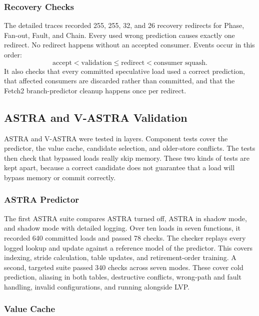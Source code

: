 \subsubsection{Recovery Checks}

The detailed traces recorded 255, 255, 32, and 26 recovery redirects
for Phase, Fan-out, Fault, and Chain. Every used wrong prediction causes exactly one redirect. No
redirect happens without an accepted consumer. Events occur in this
order:
\[
    \text{accept}
    <
    \text{validation}
    \leq
    \text{redirect}
    <
    \text{consumer squash}.
\]
It also checks that every committed speculative load used a correct
prediction, that affected consumers are discarded rather than
committed, and that the Fetch2 branch-predictor cleanup happens once
per redirect.

\subsection{ASTRA and V-ASTRA Validation}
\label{subsec:astra-vastra-validation}

ASTRA and V-ASTRA were tested in layers. Component tests cover the
predictor, the value cache, candidate selection, and older-store
conflicts. The tests then check that bypassed loads really
skip memory. These two kinds of tests are kept apart, because a
correct candidate does not guarantee that a load will bypass memory
or commit correctly.

\subsubsection{ASTRA Predictor}
\label{subsubsec:astra-validation}

The first ASTRA suite compares ASTRA turned off, ASTRA in shadow mode,
and shadow mode with detailed logging. Over ten loads in seven
functions, it recorded 640 committed loads and passed 78 checks. The
checker replays every logged lookup and update against a reference
model of the predictor. This covers indexing, stride calculation,
table updates, and retirement-order training. A second, targeted suite
passed 340 checks across seven modes. These cover cold prediction,
aliasing in both tables, destructive conflicts, wrong-path and fault
handling, invalid configurations, and running alongside LVP.

\subsubsection{Value Cache}
\label{subsubsec:vcache-validation}

